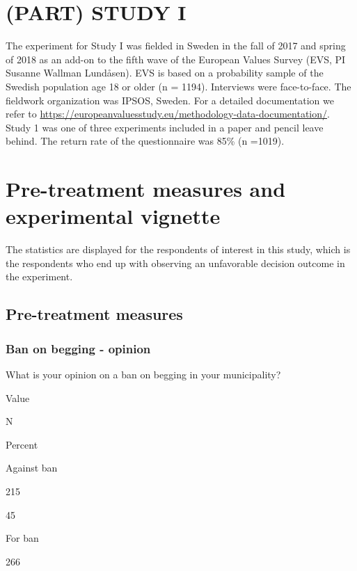 \documentclass[
]{book}
\begin{document}
\hypertarget{part-study-i}{%
\chapter{(PART) STUDY I}\label{part-study-i}}

The experiment for Study I was fielded in Sweden in the fall of 2017 and
spring of 2018 as an add-on to the fifth wave of the European Values
Survey (EVS, PI Susanne Wallman Lundåsen). EVS is based on a probability
sample of the Swedish population age 18 or older (n = 1194). Interviews
were face-to-face. The fieldwork organization was IPSOS, Sweden. For a
detailed documentation we refer to
\url{https://europeanvaluesstudy.eu/methodology-data-documentation/}.
Study 1 was one of three experiments included in a paper and pencil
leave behind. The return rate of the questionnaire was 85\% (n =1019).

\hypertarget{pre-treatment-measures-and-experimental-vignette}{%
\chapter{Pre-treatment measures and experimental
vignette}\label{pre-treatment-measures-and-experimental-vignette}}

The statistics are displayed for the respondents of interest in this
study, which is the respondents who end up with observing an unfavorable
decision outcome in the experiment.

\hypertarget{pre-treatment-measures}{%
\section{Pre-treatment measures}\label{pre-treatment-measures}}

\hypertarget{ban-on-begging---opinion}{%
\subsection{Ban on begging - opinion}\label{ban-on-begging---opinion}}

What is your opinion on a ban on begging in your municipality?

Value

N

Percent

Against ban

215

45

For ban

266
\end{document}
